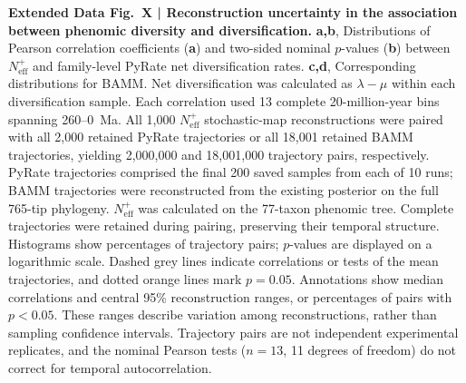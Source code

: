 \noindent\textbf{Extended Data Fig.~X | Reconstruction uncertainty in the association between phenomic diversity and diversification.}
\textbf{a,b}, Distributions of Pearson correlation coefficients (\textbf{a}) and two-sided nominal $p$-values (\textbf{b}) between $N_{\mathrm{eff}}^{+}$ and family-level PyRate net diversification rates.
\textbf{c,d}, Corresponding distributions for BAMM.
Net diversification was calculated as $\lambda-\mu$ within each diversification sample.
Each correlation used 13 complete 20-million-year bins spanning 260--0~Ma.
All 1,000 $N_{\mathrm{eff}}^{+}$ stochastic-map reconstructions were paired with all 2,000 retained PyRate trajectories or all 18,001 retained BAMM trajectories, yielding 2,000,000 and 18,001,000 trajectory pairs, respectively.
PyRate trajectories comprised the final 200 saved samples from each of 10 runs; BAMM trajectories were reconstructed from the existing posterior on the full 765-tip phylogeny.
$N_{\mathrm{eff}}^{+}$ was calculated on the 77-taxon phenomic tree.
Complete trajectories were retained during pairing, preserving their temporal structure.
Histograms show percentages of trajectory pairs; $p$-values are displayed on a logarithmic scale.
Dashed grey lines indicate correlations or tests of the mean trajectories, and dotted orange lines mark $p=0.05$.
Annotations show median correlations and central 95\% reconstruction ranges, or percentages of pairs with $p<0.05$.
These ranges describe variation among reconstructions, rather than sampling confidence intervals.
Trajectory pairs are not independent experimental replicates, and the nominal Pearson tests ($n=13$, 11 degrees of freedom) do not correct for temporal autocorrelation.

